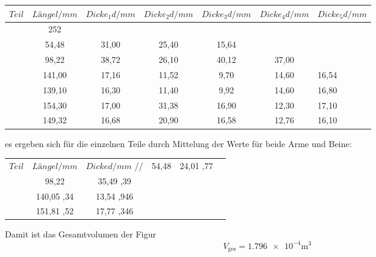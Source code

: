 \begin{table}
    \begin{tabular}{c S[table-format=2,2] S[table-format=2,2] S[table-format=2,2] S[table-format=2,2] S[table-format=2,2]}
    \toprule
    $Teil  $ & $Länge  l/mm$ & $Dicke_{1} d/mm $ & $Dicke_{2} d/mm $ & $Dicke_{3} d/mm $ & $Dicke_{4} d/mm $ & $Dicke_{5} d/mm $\\
    \midrule
       & 252    \\
                    & 54,48   &  31,00   &   25,40   & 15,64     \\
                   & 98,22   &  38,72   &   26,10   &  40,12    & 37,00 \\
       & 141,00  &  17,16   &   11,52   &   9,70    & 14,60 & 16,54 \\
        & 139,10  &  16,30   &   11,40   &   9,92    & 14,60 & 16,80 \\
      & 154,30  &  17,00   &   31,38   &  16,90    & 12,30 & 17,10 \\
       & 149,32  &  16,68   &   20,90   &  16,58    & 12,76 & 16,10 \\
    \bottomrule
    \end{tabular}
\end{table}

es ergeben sich für die einzelnen Teile durch Mittelung der Werte für beide Arme und Beine:

\begin{table}
    \begin{tabular}{c S[table-format=2,2] S[table-format=2,2] S[table-format=2,2] S[table-format=2,2] S[table-format=2,2]}
    \toprule
    $Teil  $ & $Länge  l/mm$ & $Dicke d/mm $ //
    \midrule

                    & 54,48          &  24,01 ,77       \\
                   & 98,22          &  35,49 ,39       \\
                     & 140,05 ,34&  13,54 ,946      \\
                    & 151,81 ,52&  17,77 ,346      \\
    \bottomrule
    \end{tabular}
    \end{table}

Damit ist das Gesamtvolumen der Figur
\begin{equation*}
    V_\text{ges} = \num{1,796e-4} \si{\meter\cubed}
\end{equation*}

